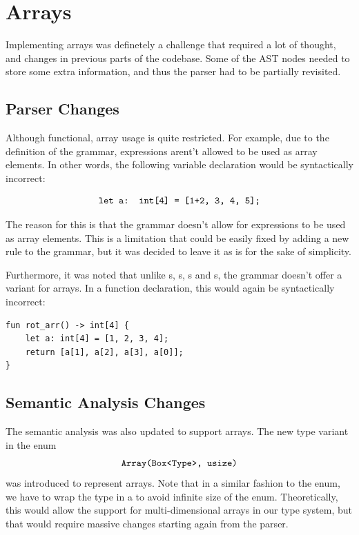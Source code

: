 \section{Arrays}

Implementing arrays was definetely a challenge that required a lot of thought,
and changes in previous parts of the codebase. Some of the AST nodes needed to
store some extra information, and thus the parser had to be partially revisited.

\subsection{Parser Changes}

Although functional, array usage is quite restricted. For example, due to the
definition of the grammar, expressions arent't allowed to be used as array elements. In other words, the following
variable declaration would be syntactically incorrect:

$$ \texttt{let a: int[4] = [1+2, 3, 4, 5];} $$

The reason for this is that the grammar doesn't allow for expressions to be used
as array elements. This is a limitation that could be easily fixed by adding a
new rule to the grammar, but it was decided to leave it as is for the sake of
simplicity.

Furthermore, it was noted that unlike s, s, s
and s, the grammar doesn't offer a  variant for arrays.
In a function declaration, this would again be syntactically incorrect:

{\lstset{xleftmargin=0.25\textwidth}
\begin{lstlisting}
fun rot_arr() -> int[4] {
    let a: int[4] = [1, 2, 3, 4];
    return [a[1], a[2], a[3], a[0]];
}
\end{lstlisting}}

\subsection{Semantic Analysis Changes}

The semantic analysis was also updated to support arrays. The new type variant
in the  enum $$\texttt{Array(Box<Type>, usize)}$$ was introduced to
represent arrays. Note that in a similar fashion to the  enum, we
have to wrap the type in a  to avoid infinite size of the 
enum. Theoretically, this would allow the support for multi-dimensional arrays
in our type system, but that would require massive changes starting again from
the parser.


